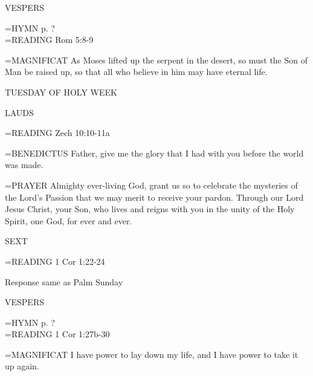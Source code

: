 \begin{flushleft}\normalsize VESPERS\\\end{flushleft}
\hangindent=\parindent \small{\uppercase{HYMN} p.  ?\\}
\hangindent=\parindent \small{READING}    Rom 5:8-9 \textbf{   \\}

\hangindent=\parindent \small{MAGNIFICAT 	As Moses lifted up the serpent in the desert, so must the Son of Man be raised up, so that all who believe in him may have eternal life.\\}

\begin{center}
\normalsize TUESDAY OF HOLY WEEK
\end{center}

\begin{flushleft}\normalsize LAUDS\\\end{flushleft}
\hangindent=\parindent \small{READING}    Zech 10:10-11a \textbf{   \\}

\hangindent=\parindent \small{BENEDICTUS 	Father, give me the glory that I had with you before the world was made.\\}

\hangindent=\parindent \small{PRAYER 	Almighty ever-living God, grant us so to celebrate the mysteries of the Lord's Passion that we may merit to receive your pardon. Through our Lord Jesus Christ, your Son, who lives and reigns with you in the unity of the Holy Spirit, one God, for ever and ever.}

\begin{flushleft}\normalsize SEXT\\\end{flushleft}
\hangindent=\parindent \small{READING}    1 Cor 1:22-24 \textbf{   }

Response same as Palm Sunday

\begin{flushleft}\normalsize VESPERS\\\end{flushleft}
\hangindent=\parindent \small{\uppercase{HYMN} p.  ?\\}
\hangindent=\parindent \small{READING}    1 Cor 1:27b-30 \textbf{   \\}

\hangindent=\parindent \small{MAGNIFICAT 	I have power to lay down my life, and I have power to take it up again.\\}

